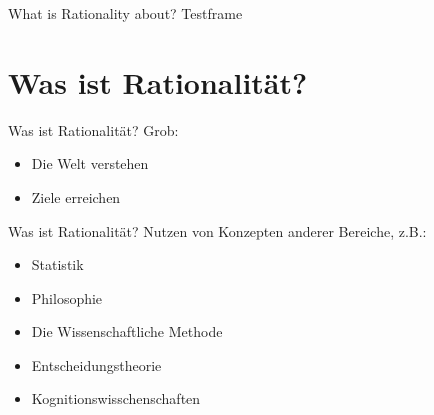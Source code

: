 \ifEnglish


\begin{frame}[c]{What is Rationality about?}
    Testframe
\end{frame}



\else

\section{Was ist Rationalität?}

\begin{frame}[c]{Was ist Rationalität?}
    \Large
    Grob:
    \newline
    \begin{itemize}
    \pause
    \item Die Welt verstehen    
    \newline
    \pause
    \pause
    \item Ziele erreichen       
    \end{itemize}
    \newline
\end{frame}


\begin{frame}[c]{Was ist Rationalität?}
    \Large
    Nutzen von Konzepten anderer Bereiche, z.B.:
    \begin{itemize}
    \pause
    \item Statistik
    \pause
    \item Philosophie
    \pause
    \item Die Wissenschaftliche Methode
    \pause
    \item Entscheidungstheorie
    \pause
    \item Kognitionswisschenschaften
    \end{itemize}
\end{frame}



\fi
